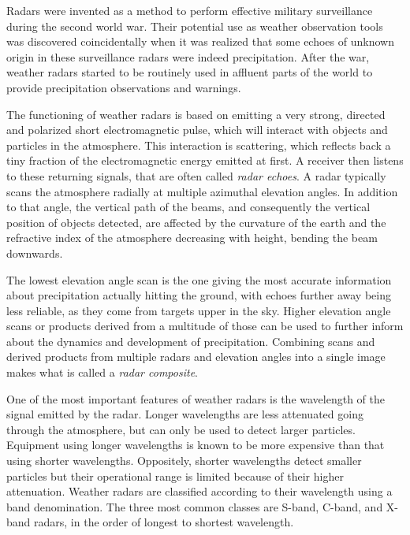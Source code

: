 Radars were invented as a method to perform effective military surveillance during the second world war. Their potential use as weather observation tools was discovered coincidentally when it was realized that some echoes of unknown origin in these surveillance radars were indeed precipitation. After the war, weather radars started to be routinely used in affluent parts of the world to provide precipitation observations and warnings.\cite{fabry_radar_2018}


The functioning of weather radars is based on emitting a very strong, directed and polarized short  electromagnetic pulse, which will interact with objects and particles in the atmosphere. This interaction is scattering, which reflects back a tiny fraction of the electromagnetic energy emitted at first. A receiver then listens to these returning signals, that are often called \textit{radar echoes}. A radar typically scans the atmosphere radially at multiple azimuthal elevation angles. In addition to that angle, the vertical path of the beams, and consequently the vertical position of objects detected, are affected by the curvature of the earth and the refractive index of the atmosphere decreasing with height, bending the beam downwards. \cite{fabry_radar_2018}

The lowest elevation angle scan is the one giving the most accurate information about precipitation actually hitting the ground, with echoes further away being less reliable, as they come from targets upper in the sky. Higher elevation angle scans or products derived from a multitude of those can be used to further inform about the dynamics and development of precipitation. Combining scans and derived products from multiple radars and elevation angles into a single image makes what is called a \textit{radar composite}.

One of the most important features of weather radars is the wavelength of the signal emitted by the radar. Longer wavelengths are less attenuated going through the atmosphere, but can only be used to detect larger particles. Equipment using longer wavelengths is known to be more expensive than that using shorter wavelengths. Oppositely, shorter wavelengths detect smaller particles but their operational range is limited because of their higher attenuation. Weather radars are classified according to their wavelength using a band denomination. The three most common classes are S-band, C-band, and X-band radars, in the order of longest to shortest wavelength.

